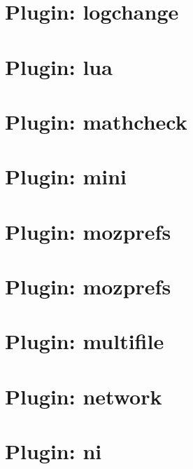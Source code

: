 \documentclass[twoside]{book}
\newcommand{\+}{\discretionary{\mbox{\scriptsize$\hookleftarrow$}}{}{}}
\begin{document}
\chapter{Plugin\+: logchange}
\label{md_src_plugins_logchange_README}

\chapter{Plugin\+: lua}
\label{md_src_plugins_lua_README}

\chapter{Plugin\+: mathcheck}
\label{md_src_plugins_mathcheck_README}

\chapter{Plugin\+: mini}
\label{md_src_plugins_mini_README}

\chapter{Plugin\+: mozprefs}
\label{md_src_plugins_mozprefs_autoconfig_README}

\chapter{Plugin\+: mozprefs}
\label{md_src_plugins_mozprefs_README}

\chapter{Plugin\+: multifile}
\label{md_src_plugins_multifile_README}

\chapter{Plugin\+: network}
\label{md_src_plugins_network_README}

\chapter{Plugin\+: ni}
\label{md_src_plugins_ni_README}

\end{document}
